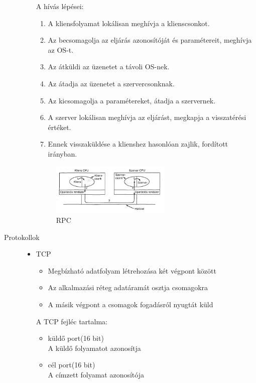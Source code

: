 \documentclass[margin=0px]{article}
\begin{document}
\begin{description}
\begin{itemize}
						A hívás lépései:
						\begin{enumerate}
							\item A kliensfolyamat lokálisan meghívja a
							klienscsonkot.
							\item Az becsomagolja az eljárás azonosítóját
							és paramétereit, meghívja az OS-t.
							\item Az átküldi az üzenetet a távoli OS-nek.
							\item Az átadja az üzenetet a
							szervercsonknak.
							\item Az kicsomagolja a paramétereket,
							átadja a szervernek.
							\item A szerver lokálisan meghívja az eljárást,
							megkapja a visszatérési értéket.
							\item Ennek visszaküldése a klienshez
							hasonlóan zajlik, fordított irányban.
					\end{enumerate}
					\begin{figure}[H]
						\centering
						\includegraphics[width=0.6\textwidth]{img/rpc.png}
						\caption{RPC}
					\end{figure}
				\end{itemize}
			\item[Protokollok] \hfill 
				\begin{itemize}
					\item TCP
						\begin{itemize}
							\item Megbízható adatfolyam létrehozása két végpont között
							\item Az alkalmazási réteg adatáramát osztja csomagokra
							\item A másik végpont a csomagok fogadásról nyugtát küld
						\end{itemize}
						A TCP fejléc tartalma:
						\begin{itemize}
							\item küldő port(16 bit)\\
								A küldő folyamatot azonosítja
							\item cél port(16 bit)\\
								A címzett folyamat azonosítója

\end{itemize}
\end{itemize}
\end{description}
\end{document}

